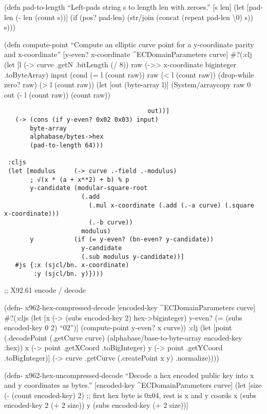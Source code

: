\documentclass[
]{article}
\begin{document}
(defn pad-to-length ``Left-pads string s to length len with zeroes.''
{[}s len{]} (let {[}pad-len (- len (count s)){]} (if (pos? pad-len)
(str/join (concat (repeat pad-len \textbackslash0) s)) s)))

(defn compute-point ``Compute an elliptic curve point for a y-coordinate
parity and x-coordinate'' {[}y-even? x-coordinate \^{}ECDomainParameters
curve{]} \#?(:clj (let {[}l (-\textgreater{} curve .getN .bitLength (/
8)) raw (-\textgreater\textgreater{} x-coordinate biginteger
.toByteArray) input (cond (= l (count raw)) raw (\textless{} l (count
raw)) (drop-while zero? raw) (\textgreater{} l (count raw)) (let {[}out
(byte-array l){]} (System/arraycopy raw 0 out (- l (count raw)) (count
raw))

\begin{verbatim}
                                       out))] 
   (-> (cons (if y-even? 0x02 0x03) input) 
       byte-array 
       alphabase/bytes->hex 
       (pad-to-length 64))) 

 :cljs 
 (let [modulus     (-> curve .-field .-modulus) 
       ; √(x * (a + x**2) + b) % p 
       y-candidate (modular-square-root 
                     (.add 
                       (.mul x-coordinate (.add (.-a curve) (.square x-coordinate))) 
                       (.-b curve)) 
                     modulus) 
       y           (if (= y-even? (bn-even? y-candidate)) 
                     y-candidate 
                     (.sub modulus y-candidate))] 
   #js {:x (sjcl/bn. x-coordinate) 
        :y (sjcl/bn. y)}))) 
\end{verbatim}

;; X92.61 encode / decode

(defn- x962-hex-compressed-decode {[}encoded-key \^{}ECDomainParameters
curve{]} \#?(:cljs (let {[}x (-\textgreater{} (subs encoded-key 2)
hex-\textgreater biginteger) y-even? (= (subs encoded-key 0 2)
``02''){]} (compute-point y-even? x curve)) :clj (let {[}point
(.decodePoint (.getCurve curve) (alphabase/base-to-byte-array
encoded-key :hex)) x (-\textgreater{} point .getXCoord .toBigInteger) y
(-\textgreater{} point .getYCoord .toBigInteger){]} (-\textgreater{}
curve .getCurve (.createPoint x y) .normalize))))

(defn- x962-hex-uncompressed-decode ``Decode a hex encoded public key
into x and y coordinates as bytes.'' {[}encoded-key
\^{}ECDomainParameters curve{]} (let {[}size (- (count encoded-key) 2)
;; first hex byte is 0x04, rest is x and y coords x (subs encoded-key 2
(+ 2 size)) y (subs encoded-key (+ 2 size)){]}
\end{document}

